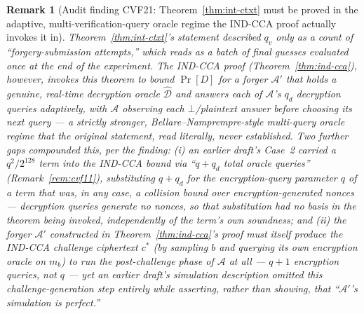 \documentclass[11pt,a4paper]{article}
\newtheorem{remark}[theorem]{Remark}
\begin{document}
\begin{remark}[Audit finding CVF21: Theorem~\ref{thm:int-ctxt} must be proved in the adaptive, multi-verification-query oracle regime the IND-CCA proof actually invokes it in]
\label{rem:cvf21}
Theorem~\ref{thm:int-ctxt}'s statement described $q_v$ only as a count of
``forgery-submission attempts,'' which reads as a batch of final guesses
evaluated once at the end of the experiment. The IND-CCA proof
(Theorem~\ref{thm:ind-cca}), however, invokes this theorem to bound
$\Pr[D]$ for a forger $\mathcal{A}'$ that holds a genuine, real-time
decryption oracle $\hat{\mathcal{D}}$ and answers each of $\mathcal{A}$'s
$q_d$ decryption queries adaptively, with $\mathcal{A}$ observing each
$\bot$/plaintext answer before choosing its next query --- a strictly
stronger, Bellare--Namprempre-style multi-query oracle regime that the
original statement, read literally, never established. Two further gaps
compounded this, per the finding: (i) an earlier draft's Case~2 carried a
$q^2/2^{128}$ term into the IND-CCA bound via ``$q+q_d$ total oracle
queries'' (Remark~\ref{rem:cvf11}), substituting $q+q_d$ for the
encryption-query parameter $q$ of a term that was, in any case, a
collision bound over \emph{encryption-generated} nonces --- decryption
queries generate no nonces, so that substitution had no basis in the
theorem being invoked, independently of the term's own soundness; and
(ii) the forger $\mathcal{A}'$ constructed in Theorem~\ref{thm:ind-cca}'s
proof must itself produce the IND-CCA challenge ciphertext $c^*$ (by
sampling $b$ and querying its own encryption oracle on $m_b$) to run the
post-challenge phase of $\mathcal{A}$ at all --- $q+1$ encryption queries,
not $q$ --- yet an earlier draft's simulation description omitted this
challenge-generation step entirely while asserting, rather than showing,
that ``$\mathcal{A}'$'s simulation is perfect.''


\end{remark}
\end{document}
